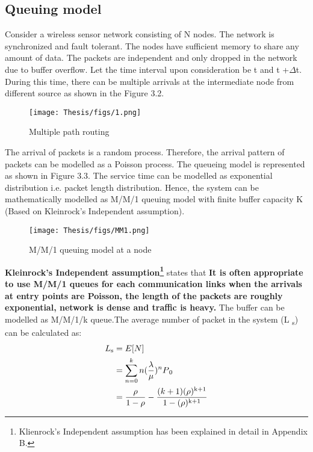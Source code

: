 \subsection{Queuing model}
Consider a wireless sensor network consisting of N nodes. The network is synchronized and fault tolerant. The nodes have sufficient memory to share any amount of data. The packets are independent and only dropped in the network due to buffer overflow. Let the time interval upon consideration be t and t +$\Delta$t. During this time, there can be multiple arrivals at the intermediate node from different source as shown in the Figure 3.2. 
\begin{figure}[H]
    \centering
    \texttt{[image: Thesis/figs/1.png]}
    \caption{Multiple path routing }
    \label{fig:my_label}
\end{figure}
\par 
The arrival of packets is a random process. Therefore, the arrival pattern of packets can be modelled as a Poisson process. The queueing model is represented as shown in Figure 3.3. The service time can be modelled as exponential distribution i.e. packet length distribution. Hence, the system can be mathematically modelled as M/M/1 queuing model with finite buffer capacity K (Based on Kleinrock’s Independent assumption).
\vspace{0.5cm}
\begin{figure}[H]
    \centering
    \texttt{[image: Thesis/figs/MM1.png]}
    \caption{M/M/1 queuing model at a node}
    \label{fig:my_label}
\end{figure}
{\bf Kleinrock's Independent assumption\footnote{Klienrock's Independent assumption has been explained in detail in Appendix B.}} states that {\bf It is often appropriate to use M/M/1 queues for each communication links when the arrivals at entry points are Poisson, the length of the packets are roughly exponential, network is dense and traffic is heavy.} 
\newline
The buffer can be modelled as M/M/1/k queue.The average  number of packet in the system (L \textsubscript{s})
can be calculated as:
\begin{equation}
\begin{split}
L \textsubscript{s} & = E [N] \\
 & = \sum_{n=0}^{k} n (\frac{\lambda}{\mu})^n  P \textsubscript{0}\\
 & = \frac{\rho}{1-\rho}-\frac{(k+1) (\rho)\textsuperscript{k+1}}{1-(\rho)\textsuperscript{k+1}}
 \end{split}
 \end{equation}
